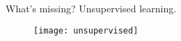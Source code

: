 \begin{frame}{What's missing? Unsupervised learning.}

\begin{figure}
    \texttt{[image: unsupervised]}
  \end{figure}
\end{frame}
